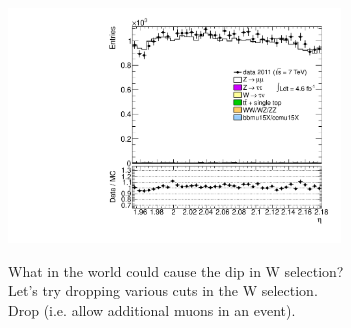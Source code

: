 {\includegraphics[width=0.66\textwidth]{dates/20130306/figures/etaphi/Znowind_10_A_stack_lN_eta_ALL.pdf} 
\cole
}


 {
What in the world could cause the dip in W selection? \\
Let's try dropping various cuts in the W selection. \\
Drop  (i.e. allow additional muons in an event).
}
